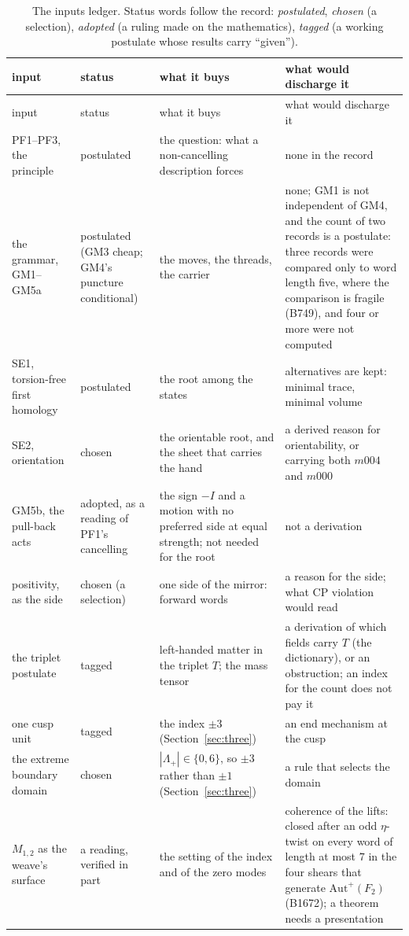{\footnotesize
\begin{longtable}{@{}p{3.2cm}p{2.4cm}p{3.6cm}p{6.0cm}@{}}
\caption{The inputs ledger. Status words follow the record: \emph{postulated}, \emph{chosen} (a selection),
\emph{adopted} (a ruling made on the mathematics), \emph{tagged} (a working postulate whose results carry ``given'').}\label{tab:inputs}\\
\toprule
input & status & what it buys & what would discharge it\\
\midrule
\endfirsthead
\toprule
input & status & what it buys & what would discharge it\\
\midrule
\endhead
\bottomrule
\endlastfoot
PF1--PF3, the principle & postulated & the question: what a non-cancelling description forces & none in the record\\
the grammar, GM1--GM5a & postulated (GM3 cheap; GM4's puncture conditional) & the moves, the threads, the carrier & none; GM1 is not independent of GM4, and the count of two records is a postulate: three records were compared only to word length five, where the comparison is fragile (B749), and four or more were not computed\\
SE1, torsion-free first homology & postulated & the root among the states & alternatives are kept: minimal trace, minimal volume\\
SE2, orientation & chosen & the orientable root, and the sheet that carries the hand & a derived reason for orientability, or carrying both $m004$ and $m000$\\
GM5b, the pull-back acts & adopted, as a reading of PF1's cancelling & the sign $-I$ and a motion with no preferred side at equal strength; not needed for the root & not a derivation\\
positivity, as the side & chosen (a selection) & one side of the mirror: forward words & a reason for the side; what CP violation would read\\
the triplet postulate & tagged & left-handed matter in the triplet $T$; the mass tensor & a derivation of which fields carry $T$ (the dictionary), or an obstruction; an index for the count does not pay it\\
one cusp unit & tagged & the index $\pm3$ (Section~\ref{sec:three}) & an end mechanism at the cusp\\
the extreme boundary domain & chosen & $|\Lambda_+|\in\{0,6\}$, so $\pm3$ rather than $\pm1$ (Section~\ref{sec:three}) & a rule that selects the domain\\
$M_{1,2}$ as the weave's surface & a reading, verified in part & the setting of the index and of the zero modes & coherence of the lifts: closed after an odd $\eta$-twist on every word of length at most $7$ in the four shears that generate $\mathrm{Aut}^+(F_2)$ (B1672); a theorem needs a presentation\\

\end{longtable}}
